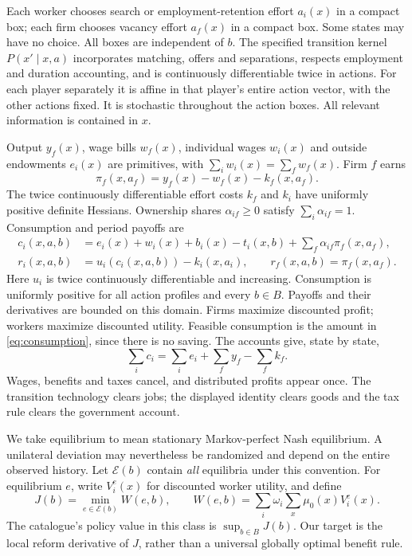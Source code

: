 \documentclass[11pt]{article}
\begin{document}
Each worker chooses search or employment-retention effort $a_i(x)$ in a compact box; each firm chooses vacancy effort $a_f(x)$ in a compact box. Some states may have no choice. All boxes are independent of $b$. The specified transition kernel $P(x'\mid x,a)$ incorporates matching, offers and separations, respects employment and duration accounting, and is continuously differentiable twice in actions. For each player separately it is affine in that player's entire action vector, with the other actions fixed. It is stochastic throughout the action boxes. All relevant information is contained in $x$.

Output $y_f(x)$, wage bills $w_f(x)$, individual wages $w_i(x)$ and outside endowments $e_i(x)$ are primitives, with $\sum_i w_i(x)=\sum_f w_f(x)$. Firm $f$ earns
\[
 \pi_f(x,a_f)=y_f(x)-w_f(x)-k_f(x,a_f).
\]
The twice continuously differentiable effort costs $k_f$ and $k_i$ have uniformly positive definite Hessians. Ownership shares $\alpha_{if}\ge0$ satisfy $\sum_i\alpha_{if}=1$. Consumption and period payoffs are
\begin{align}
 c_i(x,a,b)&=e_i(x)+w_i(x)+b_i(x)-t_i(x,b)
                   +\sum_f\alpha_{if}\pi_f(x,a_f),\label{eq:consumption}\\
 r_i(x,a,b)&=u_i(c_i(x,a,b))-k_i(x,a_i),\qquad
 r_f(x,a,b)=\pi_f(x,a_f).\label{eq:flows}
\end{align}
Here $u_i$ is twice continuously differentiable and increasing. Consumption is uniformly positive for all action profiles and every $b\in B$. Payoffs and their derivatives are bounded on this domain. Firms maximize discounted profit; workers maximize discounted utility. Feasible consumption is the amount in \eqref{eq:consumption}, since there is no saving. The accounts give, state by state,
\[
 \sum_i c_i=\sum_i e_i+\sum_f y_f-\sum_f k_f.
\]
Wages, benefits and taxes cancel, and distributed profits appear once. The transition technology clears jobs; the displayed identity clears goods and the tax rule clears the government account.

We take equilibrium to mean stationary Markov-perfect Nash equilibrium. A unilateral deviation may nevertheless be randomized and depend on the entire observed history. Let $\mathcal E(b)$ contain \emph{all} equilibria under this convention. For equilibrium $e$, write $V_i^e(x)$ for discounted worker utility, and define
\begin{equation}\label{eq:objective}
 J(b)=\min_{e\in\mathcal E(b)}W(e,b),\qquad
 W(e,b)=\sum_i\omega_i\sum_x\mu_0(x)V_i^e(x).
\end{equation}
The catalogue's policy value in this class is $\sup_{b\in B}J(b)$. Our target is the local reform derivative of $J$, rather than a universal globally optimal benefit rule.
\end{document}
